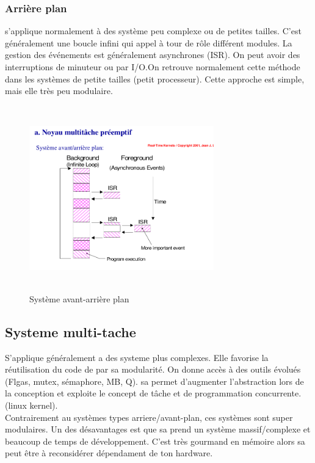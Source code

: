 \documentclass[oneside]{book}
\begin{document}
    \subsubsection{Arrière plan}
    s'applique normalement à des système peu complexe ou de petites tailles. C'est généralement une boucle infini qui appel à tour de rôle différent modules. La gestion des événements est généralement asynchrones (ISR). On peut avoir des interruptions de minuteur ou par I/O.On retrouve normalement cette méthode dans les systèmes de petite tailles (petit processeur). Cette approche est simple, mais elle très peu modulaire.\\

    \begin{figure}[!ht]
    	\centering
    	\includegraphics[width=8cm, height = 8cm, keepaspectratio]{Images/avantarriereplan.png}
    	\caption{Système avant-arrière plan}
    	\label{fig:Foreground-Background}
    \end{figure}
    
    \subsection{Systeme multi-tache}
    S'applique généralement a des systeme plus complexes. Elle favorise la réutilisation du code de par sa modularité. On donne accès à des outils évolués (Flgas, mutex, sémaphore, MB, Q). sa permet d'augmenter l'abstraction lors de la conception et exploite le concept de tâche et de programmation concurrente. (linux kernel).\\
    
    Contrairement au systèmes types arriere/avant-plan, ces systèmes sont super modulaires. Un des désavantages est que sa prend un système massif/complexe et beaucoup de temps de développement. C'est très gourmand en mémoire alors sa peut être à reconsidérer dépendament de ton hardware.\\
    
\end{document}
